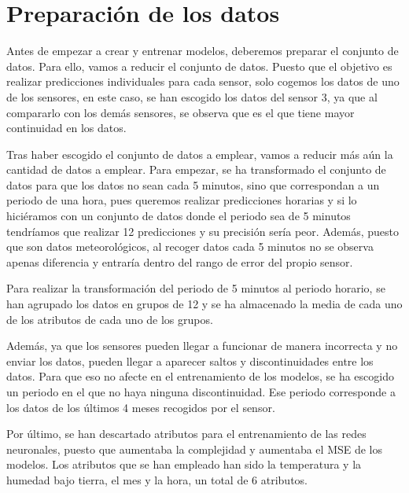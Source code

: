\section{Preparación de los datos}

Antes de empezar a crear y entrenar modelos, deberemos preparar el conjunto de datos. Para ello, vamos a reducir el conjunto de datos. Puesto que el objetivo es realizar predicciones individuales para cada sensor, solo cogemos los datos de uno de los sensores, en este caso, se han escogido los datos del sensor 3, ya que al compararlo con los demás sensores, se observa que es el que tiene mayor continuidad en los datos.

\par

Tras haber escogido el conjunto de datos a emplear, vamos a reducir más aún la cantidad de datos a emplear. Para empezar, se ha transformado el conjunto de datos para que los datos no sean cada 5 minutos, sino que correspondan a un periodo de una hora, pues queremos realizar predicciones horarias y si lo hiciéramos con un conjunto de datos donde el periodo sea de 5 minutos tendríamos que realizar 12 predicciones y su precisión sería peor. Además, puesto que son datos meteorológicos, al recoger datos cada 5 minutos no se observa apenas diferencia y entraría dentro del rango de error del propio sensor.

\par

Para realizar la transformación del periodo de 5 minutos al periodo horario, se han agrupado los datos en grupos de 12 y se ha almacenado la media de cada uno de los atributos de cada uno de los grupos.

\par

Además, ya que los sensores pueden llegar a funcionar de manera incorrecta y no enviar los datos, pueden llegar a aparecer saltos y discontinuidades entre los datos. Para que eso no afecte en el entrenamiento de los modelos, se ha escogido un periodo en el que no haya ninguna discontinuidad. Ese periodo corresponde a los datos de los últimos 4 meses recogidos por el sensor.

\par

Por último, se han descartado atributos para el entrenamiento de las redes neuronales, puesto que aumentaba la complejidad y aumentaba el MSE de los modelos. Los atributos que se han empleado han sido la temperatura y la humedad bajo tierra, el mes y la hora, un total de 6 atributos.

